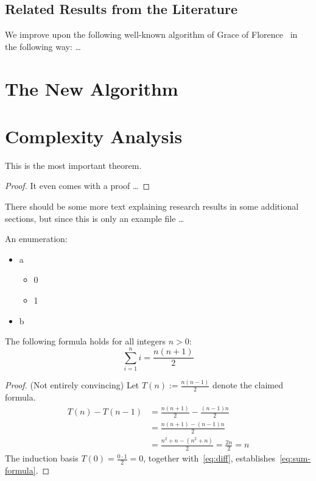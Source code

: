 \documentclass[a4paper,english,numberwithinsect]{eurocg19-submission}
\begin{document}
\subsection{Related Results from the Literature}

We improve upon the following well-known algorithm of Grace of
Florence~\cite{g-atpwog-2006} in the following way: \dots


\section{The New Algorithm}


\section{Complexity Analysis}

\begin{theorem}
This is the most important theorem.
\end{theorem}
\begin{proof}
It even comes with a proof \dots
\end{proof}

There should be some more text explaining 
research results in some additional sections, 
but since this is only an example file \dots

An enumeration:
\begin{itemize}
\item a
\begin{itemize}
  \item 0
  \item 1
\end{itemize}
\item b
\end{itemize}

\begin{lemma}
  The following formula holds
  for all integers $n>0$\textup:
\begin{equation}
  \label{eq:sum-formula}
  \sum_{i=1}^{n} i = \frac{n(n+1)}{2}
\end{equation}
\end{lemma}
\begin{proof} (Not entirely convincing)
Let \(T(n) := \frac{n(n-1)}{2}\) denote the claimed formula.
\begin{align}
  T(n) - T(n-1) &= \frac{n(n+1)}{2} - \frac{(n-1)n}{2}
\nonumber
  \\
                &= \frac{n(n+1) - (n-1)n}{2}
\nonumber
  \\
                &= \frac{n^2+n - (n^2+n)}{2} = \frac {2n}{2} = n
\label{eq:diff}
\end{align}
The induction basis $T(0)=\frac{0\cdot 1}2 = 0$, together with~\eqref{eq:diff},
establishes~\eqref{eq:sum-formula}.
\end{proof}
\end{document}
